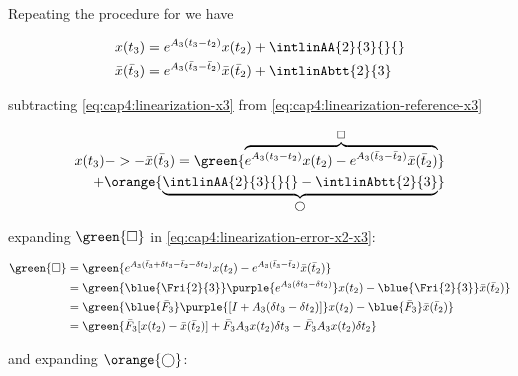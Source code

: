 
Repeating the procedure for  we have

\noindent
\begin{align}
	\label{eq:cap4:linearization-x3}
	x(t_3)  &= e^{A_3(t_3-t_2)}x(t_2) + \intlinAA{2}{3}{}{} \\
	\label{eq:cap4:linearization-reference-x3}
	\bar{x}(\bar{t}_3) &= e^{A_3(\bar{t}_3-\bar{t}_2)}\bar{x}(\bar{t}_2) + \intlinAbtt{2}{3}
\end{align}

\noindent
subtracting \eqref{eq:cap4:linearization-x3} from \eqref{eq:cap4:linearization-reference-x3} 

\noindent
\begin{equation}
	\label{eq:cap4:linearization-error-x2-x3}
	\begin{split}
		x(t_3) ->  - \bar{x}(\bar{t}_3) = \green{\overbrace{e^{A_3(t_3-t_2)}x(t_2) - e^{A_3(\bar{t}_3-\bar{t}_2)}\bar{x}(\bar{t}_2)}^{\square}} \\ 
		+ \orange{\underbrace{\intlinAA{2}{3}{}{} - \intlinAbtt{2}{3}}_{\bigcirc}}
	\end{split}
\end{equation}

\noindent 
expanding $\green{\square}$ in \eqref{eq:cap4:linearization-error-x2-x3}:

\noindent
\begin{align}
	\green{ \square } &=
	\green{
		e^{A_3(\bar{t}_3 + \delta t_3 - \bar{t}_2 - \delta t_2)} x(t_2)
		- e^{A_3(\bar{t}_3 - \bar{t}_2)} \bar{x}(\bar{t}_2)
	} \nonumber \\
	&= \green{
		\blue{\Fri{2}{3}} \purple{e^{A_3(\delta t_3 - \delta t_2)}} x(t_2)
		- \blue{\Fri{2}{3}} \bar{x}(\bar{t}_2)
	} \nonumber \\
	&= \green{
		\blue{\bar{F}_3} \purple{[I + A_3(\delta t_3 - \delta t_2)]} x(t_2)
		- \blue{\bar{F}_3} \bar{x}(\bar{t}_2)
	} \nonumber \\
	\label{eq:cap4:linearization-x3-green-term}
	&= \green{
		\bar{F}_3 [x(t_2) - \bar{x}(\bar{t}_2)] + \bar{F}_3 A_3 x(t_2) \delta t_3
		- \bar{F}_3 A_3 x(t_2) \delta t_2
	} 
\end{align}

\noindent 
and expanding $\orange{\bigcirc}$:

